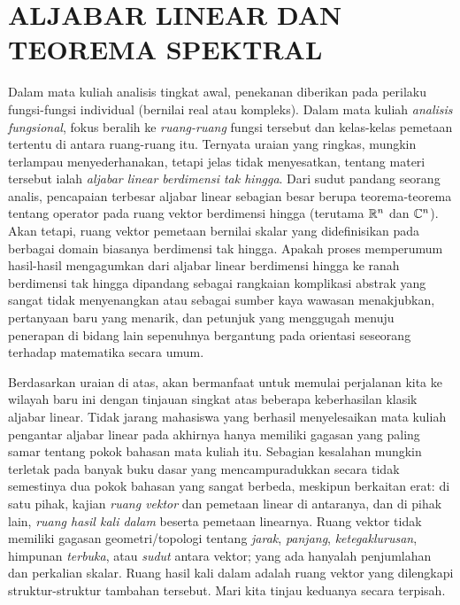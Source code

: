 \chapter{ALJABAR LINEAR DAN TEOREMA SPEKTRAL}

Dalam mata kuliah analisis tingkat awal, penekanan diberikan pada perilaku fungsi-fungsi individual (bernilai real atau kompleks). Dalam mata kuliah \emph{analisis fungsional},
fokus beralih ke \emph{ruang-ruang} fungsi tersebut dan kelas-kelas pemetaan tertentu di antara ruang-ruang itu. Ternyata uraian yang ringkas,
mungkin terlampau menyederhanakan, tetapi jelas tidak menyesatkan, tentang materi tersebut ialah \emph{aljabar linear berdimensi tak hingga}. Dari sudut pandang
seorang analis, pencapaian terbesar aljabar linear sebagian besar berupa teorema-teorema tentang operator pada ruang vektor berdimensi hingga
(terutama $\mathbb{R}^n$ dan $\mathbb{C}^n$). Akan tetapi, ruang vektor pemetaan bernilai skalar yang didefinisikan pada berbagai domain biasanya berdimensi tak
hingga. Apakah proses memperumum hasil-hasil mengagumkan dari aljabar linear berdimensi hingga ke ranah berdimensi tak hingga dipandang sebagai
rangkaian komplikasi abstrak yang sangat tidak menyenangkan atau sebagai sumber kaya wawasan menakjubkan, pertanyaan baru yang menarik, dan
petunjuk yang menggugah menuju penerapan di bidang lain sepenuhnya bergantung pada orientasi seseorang terhadap matematika secara umum.

Berdasarkan uraian di atas, akan bermanfaat untuk memulai perjalanan kita ke wilayah baru ini dengan tinjauan singkat atas beberapa keberhasilan
klasik aljabar linear. Tidak jarang mahasiswa yang berhasil menyelesaikan mata kuliah pengantar aljabar linear pada akhirnya hanya memiliki
gagasan yang paling samar tentang pokok bahasan mata kuliah itu. Sebagian kesalahan mungkin terletak pada banyak buku dasar yang mencampuradukkan
secara tidak semestinya dua pokok bahasan yang sangat berbeda, meskipun berkaitan erat: di satu pihak, kajian \emph{ruang vektor} dan pemetaan linear
di antaranya, dan di pihak lain, \emph{ruang hasil kali dalam} beserta pemetaan linearnya. Ruang vektor tidak memiliki gagasan geometri/topologi
tentang \emph{jarak}, \emph{panjang}, \emph{ketegaklurusan}, himpunan \emph{terbuka}, atau \emph{sudut} antara vektor; yang ada hanyalah penjumlahan dan perkalian skalar.
Ruang hasil kali dalam adalah ruang vektor yang dilengkapi struktur-struktur tambahan tersebut. Mari kita tinjau keduanya secara terpisah.


